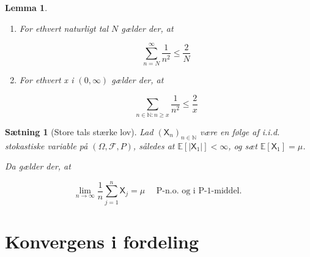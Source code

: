 \documentclass{article}
\newcommand{\1}{\mathbbm{1}}
\theoremstyle{boxed}
\newtheorem{lemma}[theorem]{Lemma}
\newtheorem{proposition}[theorem]{Sætning}
\begin{document}
\begin{theorem-box}
    \begin{lemma}
        \begin{enumerate}
            \item[\textnormal{(i)}] For ethvert naturligt tal $N$ gælder der, at

            $$
            \sum_{n=N}^{\infty} \frac{1}{n^2} \leq \frac{2}{N}
            $$
            
            \item[\textnormal{(ii)}] For ethvert x i $(0, \infty)$ gælder der, at
            
            $$
            \sum_{n \in \mathbb{N}: n \geq x} \frac{1}{n^2} \leq \frac{2}{x}
            $$
            
        \end{enumerate}
    \end{lemma}
\end{theorem-box}
\begin{theorem-box}
    \begin{proposition}[Store tals stærke lov]
        Lad $\left(\mathsf{X}_n\right)_{n \in \mathbb{N}}$ være en følge af i.i.d. stokastiske variable på $(\Omega, \mathcal{F}, P)$, således at $\mathbb{E}\left[\left|\mathsf{X}_1\right|\right]<\infty$, og sæt $\mathbb{E}\left[\mathsf{X}_1\right]=\mu$.

Da gælder der, at

$$
\lim _{n \rightarrow \infty} \frac{1}{n} \sum_{j=1}^n \mathsf{X}_j=\mu \quad \text { P-n.o. og i P-1-middel. }
$$

    \end{proposition}
\end{theorem-box}
\section{Konvergens i fordeling}
\end{document}

